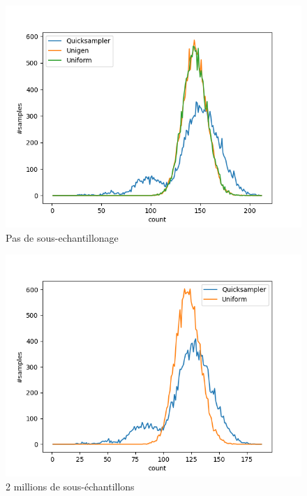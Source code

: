 \documentclass{article}
\begin{document}
\begin{figure}[!h]
    \includegraphics[scale=0.7]{DistributionFigures/Figure_case_110.png}
    \caption{Pas de sous-echantillonage}
\end{figure}
\begin{figure}[!h]
    \includegraphics[scale=0.7]{DistributionFigures/Figure_case_110_2M.png}
    \caption{2 millions de sous-échantillons}
\end{figure}
\end{document}
